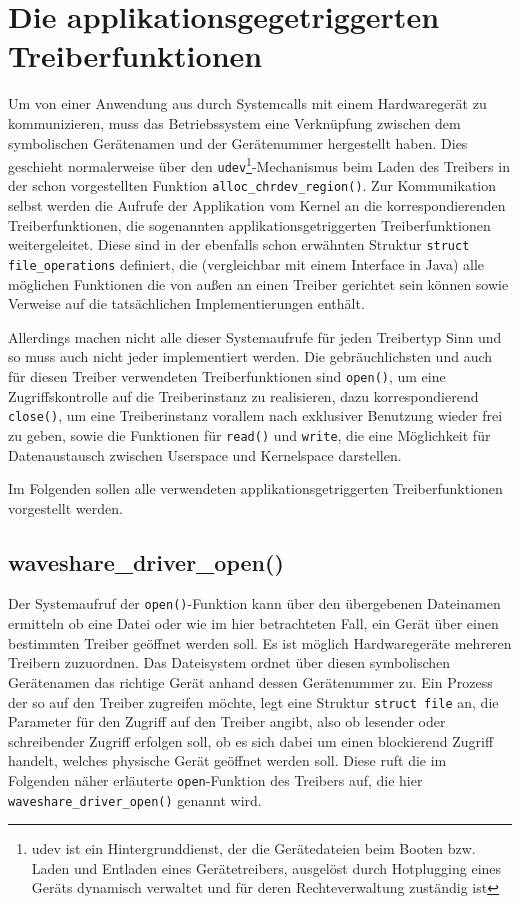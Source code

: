 \section{Die applikationsgegetriggerten Treiberfunktionen}
Um von einer Anwendung aus durch Systemcalls mit einem Hardwaregerät zu kommunizieren, muss das Betriebssystem eine Verknüpfung zwischen dem symbolischen Gerätenamen und der Gerätenummer hergestellt haben. Dies geschieht normalerweise über den \texttt{udev}\footnote{udev ist ein Hintergrunddienst, der die Gerätedateien beim Booten bzw. Laden und Entladen eines Gerätetreibers, ausgelöst durch Hotplugging eines Geräts dynamisch verwaltet und für deren Rechteverwaltung zuständig ist}-Mechanismus beim Laden des Treibers in der schon vorgestellten Funktion \texttt{alloc_chrdev_region()}. Zur Kommunikation selbst werden die Aufrufe der Applikation vom Kernel an die korrespondierenden Treiberfunktionen, die sogenannten applikationsgetriggerten Treiberfunktionen weitergeleitet. Diese sind in der ebenfalls schon erwähnten Struktur \texttt{struct file_operations} definiert, die (vergleichbar mit einem Interface in Java) alle möglichen Funktionen die von außen an einen Treiber gerichtet sein können sowie Verweise auf die tatsächlichen Implementierungen enthält. 

Allerdings machen nicht alle dieser Systemaufrufe für jeden Treibertyp Sinn und so muss auch nicht jeder implementiert werden. Die gebräuchlichsten und auch für diesen Treiber verwendeten Treiberfunktionen sind \texttt{open()}, um eine Zugriffskontrolle auf die Treiberinstanz zu realisieren, dazu korrespondierend \texttt{close()}, um eine Treiberinstanz vorallem nach exklusiver Benutzung wieder frei zu geben, sowie die Funktionen für \texttt{read()} und \texttt{write}, die eine Möglichkeit für Datenaustausch zwischen Userspace und Kernelspace darstellen. 

Im Folgenden sollen alle verwendeten applikationsgetriggerten Treiberfunktionen vorgestellt werden.


\subsection{waveshare\_driver\_open()}
Der Systemaufruf der \texttt{open()}-Funktion kann über den übergebenen Dateinamen ermitteln ob eine Datei oder wie im hier betrachteten Fall, ein Gerät über einen bestimmten Treiber geöffnet werden soll. Es ist möglich Hardwaregeräte mehreren Treibern zuzuordnen. Das Dateisystem ordnet über diesen symbolischen Gerätenamen das richtige Gerät anhand dessen Gerätenummer zu. %
Ein Prozess der so auf den Treiber zugreifen möchte, legt eine Struktur \texttt{struct file} an, die Parameter für den Zugriff auf den Treiber angibt, also ob lesender oder schreibender Zugriff erfolgen soll, ob es sich dabei um einen blockierend Zugriff handelt, welches physische Gerät geöffnet werden soll. Diese ruft die im Folgenden näher erläuterte \texttt{open}-Funktion des Treibers auf, die hier \texttt{waveshare_driver_open()} genannt wird. \newline


